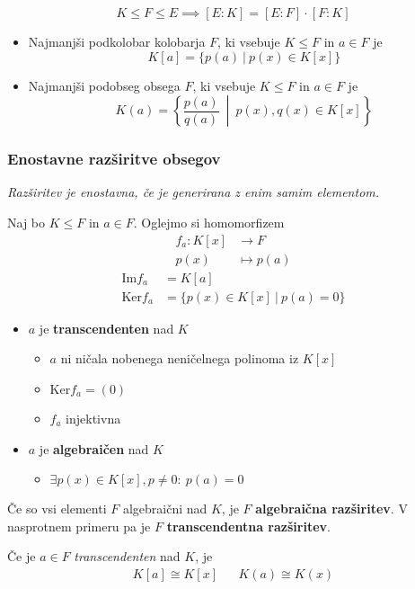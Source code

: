 \[ K \leq F \leq E \implies [E:K] = [E:F] \cdot [F:K] \]

\begin{itemize}
	\item Najmanjši podkolobar kolobarja $F$, ki vsebuje $K \leq F$ in $a \in F$ je
	\[K[a] = \{p(a)\ |\ p(x) \in K[x]\}\]
	\item Najmanjši podobseg obsega $F$, ki vsebuje $K \leq F$ in $a \in F$ je
	\[K(a) = \left\{ \frac{ p(a) }{ q(a) }\ \middle|\ p(x), q(x) \in K[x] \right\} \]
\end{itemize}

\subsubsection*{Enostavne razširitve obsegov}
\emph{Razširitev je enostavna, če je generirana z enim samim elementom.}

Naj bo $K \leq F$ in $a \in F$. Oglejmo si homomorfizem
\begin{align*}
	f_a: K[x] &\to F \\
		p(x) & \mapsto p(a)
\end{align*}
\begin{align*}
	\text{Im}f_a &= K[a] \\
	\text{Ker}f_a &= \{ p(x) \in K[x]\ |\ p(a) = 0\}
\end{align*}

\renewcommand{\labelitemii}{$\iff$}
\begin{itemize}
	\item $a$ je \textbf{transcendenten} nad $K$
	\begin{itemize}
		\item $a$ ni ničala nobenega neničelnega polinoma iz $K[x]$
		\item $\text{Ker} f_a = (0)$
		\item $f_a$ injektivna
	\end{itemize}
	\item $a$ je \textbf{algebraičen} nad $K$
	\begin{itemize}
		\item $\exists p(x) \in K[x], p \neq 0:\ p(a) = 0$
	\end{itemize}
\end{itemize}

Če so vsi elementi $F$ algebraični nad $K$, je $F$ \textbf{algebraična razširitev}. V nasprotnem primeru pa je $F$ \textbf{transcendentna razširitev}.

Če je $a \in F$ \emph{transcendenten} nad $K$, je
\begin{align*}
	K[a] \cong  K[x] && K(a) \cong K(x)
\end{align*}

